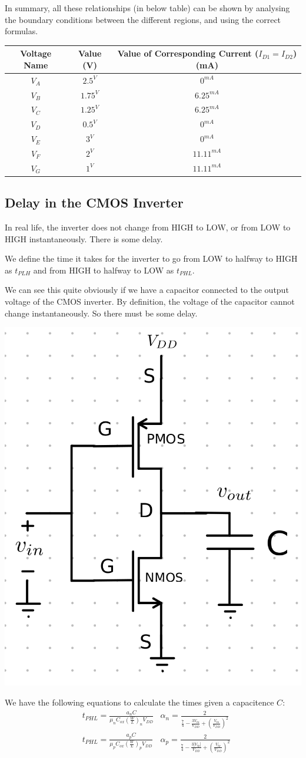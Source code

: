 \documentclass[12pt,letterpaper]{article} \usepackage{amsmath} \usepackage{graphicx} \usepackage[margin=1in]{geometry} \usepackage{longtable}  \usepackage{amssymb}
\begin{document}
\begin{mdframed}
		In summary, all these relationships (in below table) can be shown by analysing the boundary conditions between the different regions, and using the correct formulas.
		\begin{tabular}{|c|c|c|}
			\hline
			Voltage Name & Value (V) & Value of Corresponding Current ($I_{D1} = I_{D2}$) (mA) \\
			\hline
			$V_A$ & $2.5^V$ & $0^{mA}$ \\
			\hline
			$V_B$ & $1.75^V$ & $6.25^{mA}$ \\
			\hline
			$V_C$ & $1.25^V$ & $6.25 ^{mA}$ \\
			\hline
			$V_D$ & $0.5^V$ & $0^{mA}$ \\
			\hline
			$V_E$ & $3^V$ & $0^{mA}$ \\
			\hline
			$V_F$ & $2^V$ & $11.11^{mA}$ \\
			\hline
			$V_G$ & $1^V$ & $11.11^{mA}$ \\
			\hline
		\end{tabular}
	\end{mdframed}
	
	\subsection{Delay in the CMOS Inverter}
	In real life, the inverter does not change from HIGH to LOW, or from LOW to HIGH instantaneously. There is some delay.
	
	We define the time it takes for the inverter to go from LOW to halfway to HIGH as $t_{PLH}$ and from HIGH to halfway to LOW as $t_{PHL}$.
	
	We can see this quite obviously if we have a capacitor connected to the output voltage of the CMOS inverter. By definition, the voltage of the capacitor cannot change instantaneously. So there must be some delay. 
	\begin{center}
		\includegraphics[width=0.4\linewidth]{not-with-cap}
	\end{center}
	We have the following equations to calculate the times given a capacitence $C$:
	\begin{align*}
		&t_{PHL} = \frac{a_n C}{\mu_n C_{ox}\left(\frac{W}{L}\right)_n V_{DD}}& \alpha_n = \frac{2}{\frac{7}{4}-\frac{3V_{tn}}{V_{DD}}+\left(\frac{V_{tn}}{V_{DD}}\right)^2}\\
		&t_{PHL} = \frac{a_p C}{\mu_p C_{ox}\left(\frac{W}{L}\right)_p V_{DD}}& \alpha_p = \frac{2}{\frac{7}{4}-\frac{3|V_{tp}|}{V_{DD}}+\left(\frac{V_{tp}}{V_{DD}}\right)^2}
	\end{align*}
	
\end{document}
